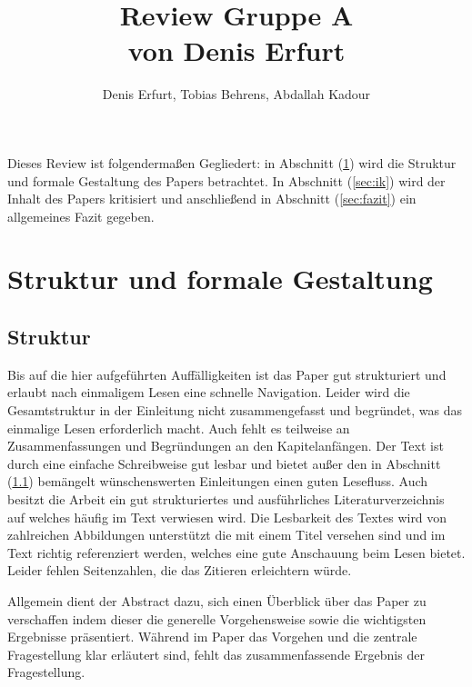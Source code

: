 \documentclass[sigconf]{acmart}
\theoremstyle{break}
\begin{document}
\title{Review Gruppe A \\ von Denis Erfurt}
\author{Denis Erfurt, Tobias Behrens, Abdallah Kadour}
\maketitle

Dieses Review ist folgendermaßen Gegliedert: in Abschnitt (\ref{sec:sfg}) wird die Struktur und formale Gestaltung des Papers betrachtet. In Abschnitt (\ref{sec:ik}) wird der Inhalt des Papers kritisiert und anschließend in Abschnitt (\ref{sec:fazit}) ein allgemeines Fazit gegeben.

\section{Struktur und formale Gestaltung}
\label{sec:sfg}

\subsection{Struktur}
\label{strukt}
Bis auf die hier aufgeführten Auffälligkeiten ist das Paper gut strukturiert und erlaubt nach einmaligem Lesen eine schnelle Navigation. Leider wird die Gesamtstruktur in der Einleitung nicht zusammengefasst und begründet, was das einmalige Lesen erforderlich macht. Auch fehlt es teilweise an Zusammenfassungen und Begründungen an den Kapitelanfängen.
Der Text ist durch eine einfache Schreibweise gut lesbar und bietet außer den in Abschnitt (\ref{strukt}) bemängelt wünschenswerten Einleitungen einen guten Lesefluss. Auch besitzt die Arbeit ein gut strukturiertes und ausführliches Literaturverzeichnis auf welches häufig im Text verwiesen wird. Die Lesbarkeit des Textes wird von zahlreichen Abbildungen unterstützt die mit einem Titel versehen sind und im Text richtig referenziert werden, welches eine gute Anschauung beim Lesen bietet.
Leider fehlen Seitenzahlen, die das Zitieren erleichtern würde.

Allgemein dient der Abstract dazu, sich einen Überblick über das Paper zu verschaffen indem dieser die generelle Vorgehensweise sowie die wichtigsten Ergebnisse präsentiert. Während im Paper das Vorgehen und die zentrale Fragestellung klar erläutert sind, fehlt das zusammenfassende Ergebnis der Fragestellung.
\end{document}
